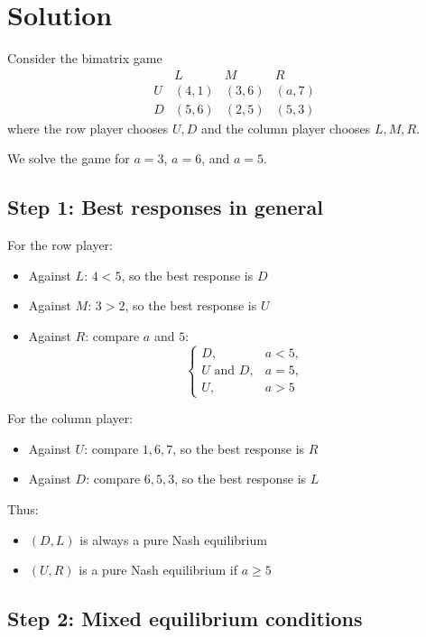 \section*{Solution}

Consider the bimatrix game
\[
\begin{array}{c|ccc}
 & L & M & R\\
\hline
U & (4,1) & (3,6) & (a,7)\\
D & (5,6) & (2,5) & (5,3)
\end{array}
\]
where the row player chooses \(U,D\) and the column player chooses \(L,M,R\).

We solve the game for \(a=3\), \(a=6\), and \(a=5\).

\subsection*{Step 1: Best responses in general}

For the row player:

\begin{itemize}
\item Against \(L\): \(4<5\), so the best response is \(D\)
\item Against \(M\): \(3>2\), so the best response is \(U\)
\item Against \(R\): compare \(a\) and \(5\):
\[
\begin{cases}
D, & a<5,\\
U \text{ and } D, & a=5,\\
U, & a>5
\end{cases}
\]
\end{itemize}

For the column player:

\begin{itemize}
\item Against \(U\): compare \(1,6,7\), so the best response is \(R\)
\item Against \(D\): compare \(6,5,3\), so the best response is \(L\)
\end{itemize}

Thus:
\begin{itemize}
\item \((D,L)\) is always a pure Nash equilibrium
\item \((U,R)\) is a pure Nash equilibrium if \(a\ge 5\)
\end{itemize}

\subsection*{Step 2: Mixed equilibrium conditions}

